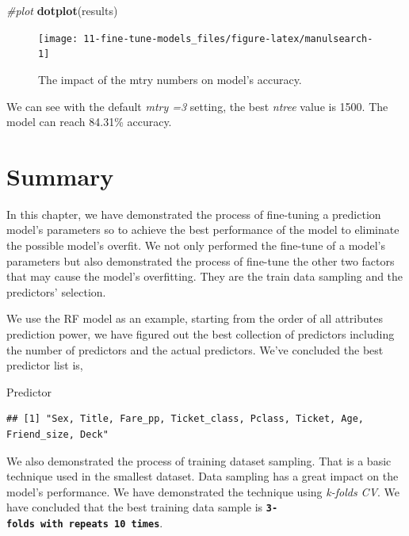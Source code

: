 \documentclass[
]{book}
\newenvironment{Shaded}{\begin{snugshade}}{\end{snugshade}}
\newcommand{\CommentTok}[1]{\textcolor[rgb]{0.56,0.35,0.01}{\textit{#1}}}
\newcommand{\KeywordTok}[1]{\textcolor[rgb]{0.13,0.29,0.53}{\textbf{#1}}}
\newcommand{\NormalTok}[1]{#1}
\begin{document}
\begin{Shaded}
\begin{Highlighting}[]
\CommentTok{#plot }
\KeywordTok{dotplot}\NormalTok{(results)}
\end{Highlighting}
\end{Shaded}

\begin{figure}

{\centering \texttt{[image: 11-fine-tune-models\_files/figure-latex/manulsearch-1]} 

}

\caption{The impact of the mtry numbers on model's accuracy.}\label{fig:manulsearch}
\end{figure}

We can see with the default \emph{mtry =3} setting, the best \emph{ntree} value is 1500. The model can reach 84.31\% accuracy.

\hypertarget{summary-9}{%
\section*{Summary}\label{summary-9}}


In this chapter, we have demonstrated the process of fine-tuning a prediction model's parameters so to achieve the best performance of the model to eliminate the possible model's overfit. We not only performed the fine-tune of a model's parameters but also demonstrated the process of fine-tune the other two factors that may cause the model's overfitting. They are the train data sampling and the predictors' selection.

We use the RF model as an example, starting from the order of all attributes prediction power, we have figured out the best collection of predictors including the number of predictors and the actual predictors. We've concluded the best predictor list is,

\begin{Shaded}
\begin{Highlighting}[]
\NormalTok{Predictor}
\end{Highlighting}
\end{Shaded}

\begin{verbatim}
## [1] "Sex, Title, Fare_pp, Ticket_class, Pclass, Ticket, Age, Friend_size, Deck"
\end{verbatim}

We also demonstrated the process of training dataset sampling. That is a basic technique used in the smallest dataset. Data sampling has a great impact on the model's performance. We have demonstrated the technique using \emph{k-folds CV}. We have concluded that the best training data sample is \textbf{\texttt{3-folds\ with\ repeats\ 10\ times}}.
\end{document}
